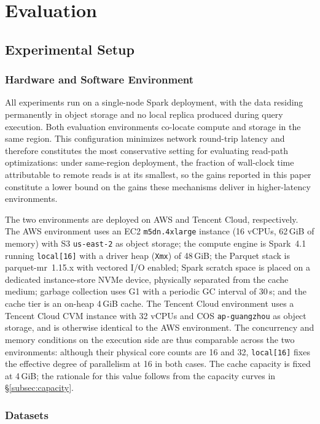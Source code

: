 
\section{Evaluation}
\subsection{Experimental Setup}
\label{subsec:setup}

\subsubsection{Hardware and Software Environment}

All experiments run on a single-node Spark deployment, with the data residing
permanently in object storage and no local replica produced during query
execution. Both evaluation environments co-locate compute and storage in the
same region. This configuration minimizes network round-trip latency and
therefore constitutes the most conservative setting for evaluating read-path
optimizations: under same-region deployment, the fraction of wall-clock time
attributable to remote reads is at its smallest, so the gains reported in this
paper constitute a lower bound on the gains these mechanisms deliver in
higher-latency environments.

The two environments are deployed on AWS and Tencent Cloud, respectively. The
AWS environment uses an EC2 \texttt{m5dn.4xlarge} instance (16 vCPUs, 62\,GiB
of memory) with S3 \texttt{us-east-2} as object storage; the compute engine is
Spark~4.1 running \texttt{local[16]} with a driver heap (\texttt{Xmx}) of
48\,GiB; the Parquet stack is parquet-mr~1.15.x with vectored I/O enabled;
Spark scratch space is placed on a dedicated instance-store NVMe device,
physically separated from the cache medium; garbage collection uses G1 with a
periodic GC interval of 30\,s; and the cache tier is an on-heap 4\,GiB cache.
The Tencent Cloud environment uses a Tencent Cloud CVM instance with 32 vCPUs
and COS \texttt{ap-guangzhou} as object storage, and is otherwise identical to
the AWS environment. The concurrency and memory conditions on the execution
side are thus comparable across the two environments: although their physical
core counts are 16 and 32, \texttt{local[16]} fixes the effective degree of
parallelism at 16 in both cases. The cache capacity is fixed at 4\,GiB; the
rationale for this value follows from the capacity curves in
\S\ref{subsec:capacity}.

\subsubsection{Datasets}

